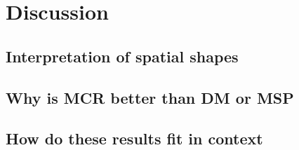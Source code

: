 \chapter{Discussion}
\label{ch:discussion}


%	

\section{Interpretation of spatial shapes}
%		




\section{Why is MCR better than DM or MSP}
%



\section{How do these results fit in context}
%		



